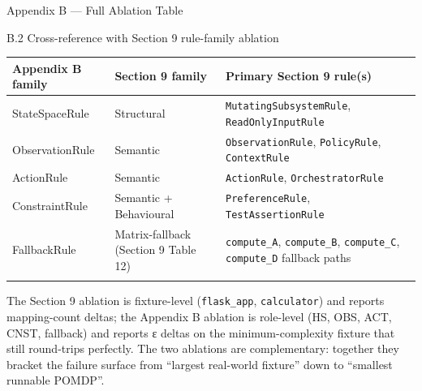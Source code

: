 \documentclass[
  ignorenonframetext,
]{beamer}
\newcounter{none} %
\begin{document}
\begin{frame}[fragile]{Appendix B --- Full Ablation Table}
\begin{block}{B.2 Cross-reference with Section 9 rule-family ablation}
{\def\LTcaptype{none} %
\begin{longtable}[]{@{}
  >{\raggedright\arraybackslash}p{}
  >{\raggedright\arraybackslash}p{}
  >{\raggedright\arraybackslash}p{}@{}}
\toprule\noalign{}
\begin{minipage}[b]{\linewidth}\raggedright
Appendix B family
\end{minipage} & \begin{minipage}[b]{\linewidth}\raggedright
Section 9 family
\end{minipage} & \begin{minipage}[b]{\linewidth}\raggedright
Primary Section 9 rule(s)
\end{minipage} \\
\midrule\noalign{}
\endhead
StateSpaceRule & Structural & \texttt{MutatingSubsystemRule},
\texttt{ReadOnlyInputRule} \\
ObservationRule & Semantic & \texttt{ObservationRule},
\texttt{PolicyRule}, \texttt{ContextRule} \\
ActionRule & Semantic & \texttt{ActionRule},
\texttt{OrchestratorRule} \\
ConstraintRule & Semantic + Behavioural & \texttt{PreferenceRule},
\texttt{TestAssertionRule} \\
FallbackRule & Matrix-fallback (Section 9 Table 12) &
\texttt{compute\_A}, \texttt{compute\_B}, \texttt{compute\_C},
\texttt{compute\_D} fallback paths \\
\bottomrule\noalign{}
\end{longtable}
}

The Section 9 ablation is fixture-level (\texttt{flask\_app},
\texttt{calculator}) and reports mapping-count deltas; the Appendix B
ablation is role-level (HS, OBS, ACT, CNST, fallback) and reports ε
deltas on the minimum-complexity fixture that still round-trips
perfectly. The two ablations are complementary: together they bracket
the failure surface from ``largest real-world fixture'' down to
``smallest runnable POMDP''.
\end{block}
\end{frame}

\begin{frame}
\end{frame}
\end{document}
